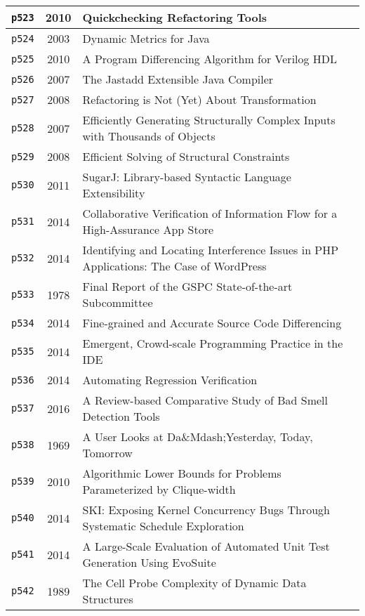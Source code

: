 \begin{longtable}{| c | c | p{16cm} |}
  \hline
  \texttt{p523} & 2010 & Quickchecking Refactoring Tools \\
  \hline
  \texttt{p524} & 2003 & Dynamic Metrics for Java \\
  \hline
  \texttt{p525} & 2010 & A Program Differencing Algorithm for Verilog HDL \\
  \hline
  \texttt{p526} & 2007 & The Jastadd Extensible Java Compiler \\
  \hline
  \texttt{p527} & 2008 & Refactoring is Not (Yet) About Transformation \\
  \hline
  \texttt{p528} & 2007 & Efficiently Generating Structurally Complex Inputs with Thousands of Objects \\
  \hline
  \texttt{p529} & 2008 & Efficient Solving of Structural Constraints \\
  \hline
  \texttt{p530} & 2011 & SugarJ: Library-based Syntactic Language Extensibility \\
  \hline
  \texttt{p531} & 2014 & Collaborative Verification of Information Flow for a High-Assurance App Store \\
  \hline
  \texttt{p532} & 2014 & Identifying and Locating Interference Issues in PHP Applications: The Case of WordPress \\
  \hline
  \texttt{p533} & 1978 & Final Report of the GSPC State-of-the-art Subcommittee \\
  \hline
  \texttt{p534} & 2014 & Fine-grained and Accurate Source Code Differencing \\
  \hline
  \texttt{p535} & 2014 & Emergent, Crowd-scale Programming Practice in the IDE \\
  \hline
  \texttt{p536} & 2014 & Automating Regression Verification \\
  \hline
  \texttt{p537} & 2016 & A Review-based Comparative Study of Bad Smell Detection Tools \\
  \hline
  \texttt{p538} & 1969 & A User Looks at Da\&Mdash;Yesterday, Today, Tomorrow \\
  \hline
  \texttt{p539} & 2010 & Algorithmic Lower Bounds for Problems Parameterized by Clique-width \\
  \hline
  \texttt{p540} & 2014 & SKI: Exposing Kernel Concurrency Bugs Through Systematic Schedule Exploration \\
  \hline
  \texttt{p541} & 2014 & A Large-Scale Evaluation of Automated Unit Test Generation Using EvoSuite \\
  \hline
  \texttt{p542} & 1989 & The Cell Probe Complexity of Dynamic Data Structures \\

\end{longtable}
